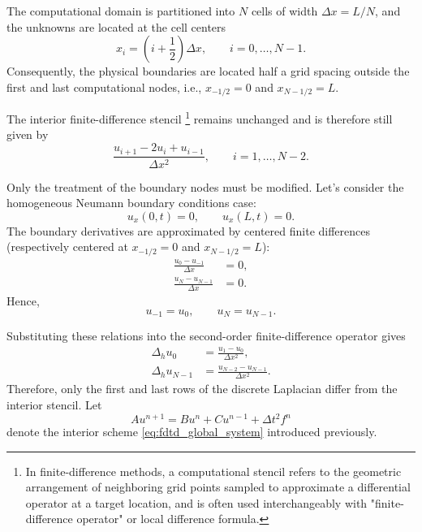 \documentclass{Configuration_Files/PoliMi3i_thesis}
\newif\ifshowthesischanges
\DeclareRobustCommand{\thesischange}[2]{%
    \ifshowthesischanges
        \textcolor{#1}{#2}%
    \else
        #2%
    \fi
}
\def\thesischange#1#2{#2}%
\begin{document}
The computational domain is partitioned into $N$ cells of width
$\Delta x=L/N$, and the unknowns are located at the cell centers
\begin{equation*}
x_i
=
\left(i+\frac12\right)\Delta x,
\qquad
i=0,\ldots,N-1.
\end{equation*}
Consequently, the physical boundaries are located half a grid spacing outside the first and last computational nodes, i.e., $x_{-1/2}=0$ and $x_{N-1/2}=L$.

The interior finite-difference stencil \footnote{\thesischange{red}{In finite-difference methods, a computational stencil refers to the geometric arrangement of neighboring grid points sampled to approximate a differential operator at a target location, and is often used interchangeably with "finite-difference operator" or local difference formula.}} remains unchanged and is therefore still given by
\begin{equation*}
\frac{
u_{i+1}-2u_i+u_{i-1}
}{\Delta x^2},
\qquad
i=1,\ldots,N-2.
\end{equation*}

Only the treatment of the boundary nodes must be modified. Let's consider the homogeneous Neumann boundary conditions case:
\begin{equation*}
u_x(0,t)=0,
\qquad
u_x(L,t)=0.
\end{equation*}
The boundary derivatives are approximated by centered finite differences (respectively centered at $x_{-1/2}=0$ and $x_{N-1/2} = L$):
\begin{align*}
\frac{u_0-u_{-1}}{\Delta x}
&=0,
\\
\frac{u_N-u_{N-1}}{\Delta x}
&=0.
\end{align*}
Hence,
\begin{equation*}
u_{-1}=u_0,
\qquad
u_N=u_{N-1}.
\end{equation*}

Substituting these relations into the second-order finite-difference operator gives
\begin{align*}
\Delta_hu_0
&=
\frac{u_1-u_0}{\Delta x^2},
\\
\Delta_hu_{N-1}
&=
\frac{u_{N-2}-u_{N-1}}{\Delta x^2}.
\end{align*}
Therefore, only the first and last rows of the discrete Laplacian differ from the interior stencil. Let
\begin{equation*}
A u^{n+1}
=
B u^n
+
C u^{n-1}
+
\Delta t^2f^n
\end{equation*}
denote the interior scheme \eqref{eq:fdtd_global_system} introduced previously.
\end{document}
